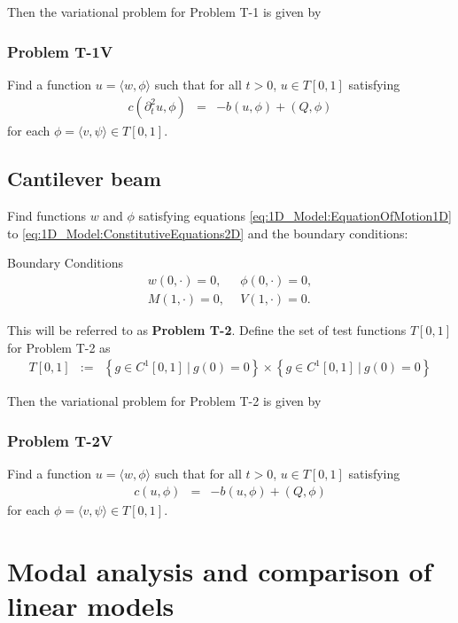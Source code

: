 				Then the variational problem for Problem T-1 is given by
				\subsubsection*{Problem T-1V}\label{sssec:1D_Model:ProblemT1V}
					Find a function ${u} = \langle w, \phi \rangle$ such that for all $t >0$, ${u} \in  T[0,1]$ satisfying
					\begin{eqnarray}
						c(\partial_t^2 u,{\phi}) &=& -b({u},{\phi}) + (Q,{\phi})
					\end{eqnarray} for each ${\phi} = \langle v, \psi \rangle \in T[0,1]$.

			\subsection*{Cantilever beam}
				Find functions $w$ and $\phi$ satisfying equations \eqref{eq:1D_Model:EquationOfMotion1D} to \eqref{eq:1D_Model:ConstitutiveEquations2D} and the boundary conditions:

				{Boundary Conditions}\\
				\begin{eqnarray*}
					w(0,\cdot) = 0, \ \ &\phi(0,\cdot) = 0, \label{eq:1D_Model:ProblemT2BC1}\\
					M(1,\cdot) = 0, \ \ &V(1,\cdot) = 0. \label{eq:1D_Model:ProblemT2BC2}
				\end{eqnarray*}

				This will be referred to as \textbf{Problem T-2}.  Define the set of test functions $T[0,1]$ for Problem T-2 as
				\begin{eqnarray*}
					T[0,1] &:=& \left\{g \in C^1[0,1] \ | \ g(0) = 0 \right\} \times \left\{g \in C^1[0,1] \ | \ g(0) = 0 \right\}
				\end{eqnarray*}

				Then the variational problem for Problem T-2 is given by
				\subsubsection*{Problem T-2V}\label{sssec:1D_Model:ProblemT1V}
					Find a function ${u} = \langle w, \phi \rangle$ such that for all $t >0$, ${u} \in  T[0,1]$ satisfying
					\begin{eqnarray}
						c(u,{\phi}) &=& -b({u},{\phi}) + (Q,{\phi}) \label{var_form_timo}
					\end{eqnarray} for each ${\phi} = \langle v, \psi \rangle \in T[0,1]$. 	
				
\section{Modal analysis and comparison of linear models}	

